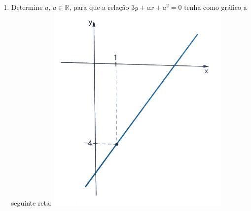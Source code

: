 \documentclass[a4paper,14pt]{article}
\begin{document}
\begin{multicols}{2}
\begin{enumerate}
\begin{enumerate}[a)]
		    \end{enumerate}
	        \item Determine $a$, $a \in \mathbb{R}$, para que a relação $3y + ax + a^2 = 0$ tenha como gráfico a seguinte reta:
	        \includegraphics[width=1\linewidth]{imagens_8FMA73/imagem1} \\\\\\\\\\\\\\\\\\\\\\\\\\\\\\\\\\\\\\\\\\\\\\

\end{enumerate}
\end{multicols}
\end{document}
